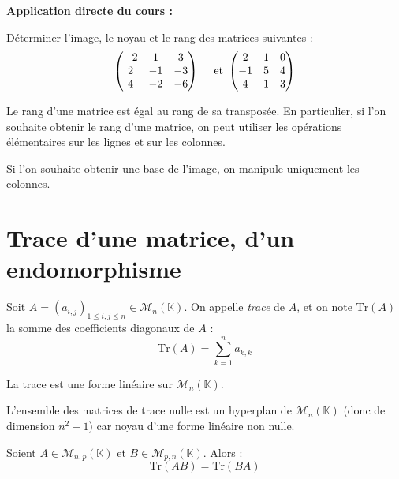 \documentclass[french,11pt,twoside]{VcCours}
\newenvironment{ApplicationDirecte}{\textbf{Application directe du cours :}

}{}
\begin{document}
\begin{ApplicationDirecte} Déterminer l'image, le noyau et le rang des matrices suivantes :
$$ \begin{pmatrix}
-2 & 1 & 3 \\
2 & -1 & -3 \\
4 & -2 & -6 \\
\end{pmatrix} \quad \hbox{ et } \begin{pmatrix}
2 & 1 & 0 \\
-1 & 5 & 4 \\
4 & 1 & 3 \\
\end{pmatrix} $$
\end{ApplicationDirecte}

\begin{Theoreme}{} Le rang d'une matrice est égal au rang de sa transposée. 
En particulier, si l'on souhaite obtenir le rang d'une matrice, on peut utiliser les opérations élémentaires sur les lignes et sur les colonnes. 
\end{Theoreme}

\begin{Remarque}{\warning}
 Si l'on souhaite obtenir une base de l'image, on manipule uniquement les colonnes.
\end{Remarque}
\section{Trace d'une matrice, d'un endomorphisme}

\begin{Definition}{} Soit $A=(a_{i,j})_{1 \leq i,j \leq n} \in \mathcal{M}_n(\mathbb{K})$. On appelle \emph{trace} de $A$, et on note $\textrm{Tr}(A)$ la somme des coefficients diagonaux de $A$ :
$$\textrm{Tr}(A) = \sum_{k=1}^n a_{k,k}$$
\end{Definition}

\begin{Proposition}{} La trace est une forme linéaire sur $\mathcal{M}_n( \mathbb{K})$.
\end{Proposition}

\begin{Exemple} L'ensemble des matrices de trace nulle est un hyperplan de $\mathcal{M}_n(\mathbb{K})$ (donc de dimension $n^2-1$) car noyau d'une forme linéaire non nulle.
\end{Exemple}

\begin{Proposition}{} Soient $A \in \mathcal{M}_{n,p}(\mathbb{K})$ et $B \in \mathcal{M}_{p,n}(\mathbb{K})$. Alors :
$$ \textrm{Tr}(AB) = \textrm{Tr}(BA) $$
\end{Proposition}
\end{document}
